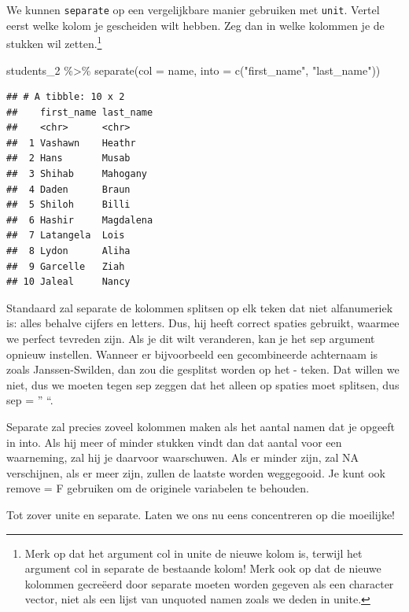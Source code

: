 \documentclass[]{tufte-book}
\newenvironment{Shaded}{}{}
\newcommand{\AttributeTok}[1]{\textcolor[rgb]{0.49,0.56,0.16}{#1}}
\newcommand{\FunctionTok}[1]{\textcolor[rgb]{0.02,0.16,0.49}{#1}}
\newcommand{\NormalTok}[1]{#1}
\newcommand{\SpecialCharTok}[1]{\textcolor[rgb]{0.25,0.44,0.63}{#1}}
\newcommand{\StringTok}[1]{\textcolor[rgb]{0.25,0.44,0.63}{#1}}
\begin{document}
We kunnen \texttt{separate} op een vergelijkbare manier gebruiken met \texttt{unit}. Vertel eerst welke kolom je gescheiden wilt hebben. Zeg dan in welke kolommen je de stukken wil zetten.\footnote{Merk op dat het argument col in unite de nieuwe kolom is, terwijl het argument col in separate de bestaande kolom! Merk ook op dat de nieuwe kolommen gecreëerd door separate moeten worden gegeven als een character vector, niet als een lijst van unquoted namen zoals we deden in unite.}

\begin{Shaded}
\begin{Highlighting}[]
\NormalTok{students\_2 }\SpecialCharTok{\%\textgreater{}\%}
  \FunctionTok{separate}\NormalTok{(}\AttributeTok{col =}\NormalTok{ name, }\AttributeTok{into =} \FunctionTok{c}\NormalTok{(}\StringTok{"first\_name"}\NormalTok{, }\StringTok{"last\_name"}\NormalTok{))}
\end{Highlighting}
\end{Shaded}

\begin{verbatim}
## # A tibble: 10 x 2
##    first_name last_name
##    <chr>      <chr>    
##  1 Vashawn    Heathr   
##  2 Hans       Musab    
##  3 Shihab     Mahogany 
##  4 Daden      Braun    
##  5 Shiloh     Billi    
##  6 Hashir     Magdalena
##  7 Latangela  Lois     
##  8 Lydon      Aliha    
##  9 Garcelle   Ziah     
## 10 Jaleal     Nancy
\end{verbatim}

Standaard zal separate de kolommen splitsen op elk teken dat niet alfanumeriek is: alles behalve cijfers en letters. Dus, hij heeft correct spaties gebruikt, waarmee we perfect tevreden zijn. Als je dit wilt veranderen, kan je het sep argument opnieuw instellen. Wanneer er bijvoorbeeld een gecombineerde achternaam is zoals Janssen-Swilden, dan zou die gesplitst worden op het - teken. Dat willen we niet, dus we moeten tegen sep zeggen dat het alleen op spaties moet splitsen, dus sep = '' ``.

Separate zal precies zoveel kolommen maken als het aantal namen dat je opgeeft in into. Als hij meer of minder stukken vindt dan dat aantal voor een waarneming, zal hij je daarvoor waarschuwen. Als er minder zijn, zal NA verschijnen, als er meer zijn, zullen de laatste worden weggegooid. Je kunt ook remove = F gebruiken om de originele variabelen te behouden.

Tot zover unite en separate. Laten we ons nu eens concentreren op die moeilijke!
\end{document}
